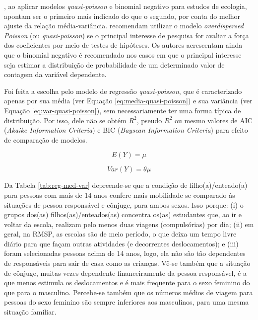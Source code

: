 , ao aplicar modelos \textit{quasi-poisson} e binomial negativo para estudos de ecologia, apontam ser o primeiro mais indicado do que o segundo, por conta do melhor ajuste da relação média-variância.
 recomendam utilizar o modelo \textit{overdispersed Poisson} (ou \textit{quasi-poisson}) se o principal interesse de pesquisa for avaliar a força dos coeficientes por meio de testes de hipóteses. 
Os autores acrescentam ainda que o binomial negativo é recomendado nos casos em que o principal interesse seja estimar a distribuição de probabilidade de um determinado valor de contagem da variável dependente.

Foi feita a escolha pelo modelo de regressão \textit{quasi-poisson}, que é caracterizado apenas por sua média  (ver Equação \ref {eq:media-quasi-poisson}) e sua variância (ver Equação \ref{eq:var-quasi-poisson}), sem necessariamente ter uma forma típica de distribuição. Por isso, dele não se obtém $R^2$, pseudo $R^2$ ou mesmo valores de AIC (\textit{Akaike Information Criteria}) e BIC (\textit{Baysean Information Criteria}) para efeito de comparação de modelos.

\begin{equation}\label{eq:media-quasi-poisson} 
E(Y) = \mu
\end{equation}

\begin{equation}\label{eq:var-quasi-poisson} 
Var(Y) = \theta \mu
\end{equation}

Da Tabela \ref{tab:reg-med-var} depreende-se que a condição de filho(a)/enteado(a) para pessoas com mais de 14 anos confere mais mobilidade se comparado às situações de pessoa responsável e cônjuge, para ambos sexos. Isso porque:
(i) o grupos dos(as) filhos(as)/enteados(as) concentra os(as) estudantes que, ao ir e voltar da escola, realizam pelo menos duas viagens (compulsórias) por dia;
(ii) em geral, na RMSP, as escolas são de meio período, o que deixa um tempo livre diário para que façam outras atividades (e decorrentes  deslocamentos); e 
(iii) foram selecionadas pessoas acima de 14 anos, logo, ela não são tão dependentes de responsáveis para sair de casa como as crianças.
Vê-se também que a situação de cônjuge, muitas vezes dependente financeiramente da pessoa responsável, é a que menos estimula os deslocamentos e é mais frequente para o sexo feminino do que para o masculino.
Percebe-se também que os números médios de viagem para pessoas do sexo feminino são sempre inferiores aos masculinos, para uma mesma situação familiar.

